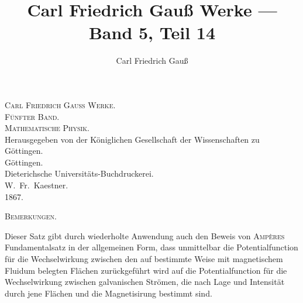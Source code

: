 \documentclass[12pt,a4paper]{article}
\title{Carl Friedrich Gauß Werke --- Band 5, Teil 14}
\author{Carl Friedrich Gauß}
\date{}
\begin{document}
\maketitle
\thispagestyle{empty}

\vfill

\begin{center}
\textsc{Carl Friedrich Gauß Werke.}\\[1em]
\textsc{Fünfter Band.}\\[1em]
\textsc{Mathematische Physik.}\\[2em]
{\small Herausgegeben von der Königlichen Gesellschaft der Wissenschaften zu Göttingen.}\\[2em]
{\large Göttingen.}\\
{\small Dieterichsche Universitäts-Buchdruckerei.}\\
{\small W.~Fr.~Kaestner.}\\
{\small 1867.}
\end{center}

\vfill

\newpage

\thispagestyle{bemerkungen}
\setcounter{page}{639}

\begin{center}
\textsc{Bemerkungen.}
\end{center}

\vspace{0.5em}

Dieser Satz gibt durch wiederholte Anwendung auch den Beweis von \textsc{Ampères} Fundamentalsatz in der allgemeinen Form, dass unmittelbar die Potentialfunction für die Wechselwirkung zwischen den auf bestimmte Weise mit magnetischem Fluidum belegten Flächen zurückgeführt wird auf die Potentialfunction für die Wechselwirkung zwischen galvanischen Strömen, die nach Lage und Intensität durch jene Flächen und die Magnetisirung bestimmt sind.

\vspace{0.5em}
\end{document}
